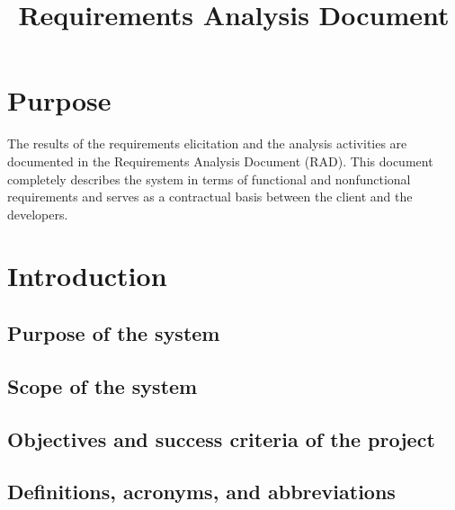 \documentclass[a4paper,12pt]{article}
\makeatletter
\renewcommand{\maketitle}{\bgroup\setlength{\parindent}{0pt}
\begin{flushleft}
  {\Huge\textbf{\@title}}
\end{flushleft}\egroup
}
\makeatother
\begin{document}
 \title{Requirements Analysis Document}
 \maketitle

 \section*{\color{black}Purpose}

 The results of the requirements elicitation and the analysis activities are documented in the Requirements Analysis Document (RAD). This document completely describes the system in terms of functional and nonfunctional requirements and serves as a contractual basis between the client and the developers.

 \setcounter{tocdepth}{2}
 \tableofcontents

 \section{Introduction}

 \subsection{Purpose of the system}

 \subsection{Scope of the system}

 \subsection{Objectives and success criteria of the project}

 \subsection{Definitions, acronyms, and abbreviations}
\end{document}
